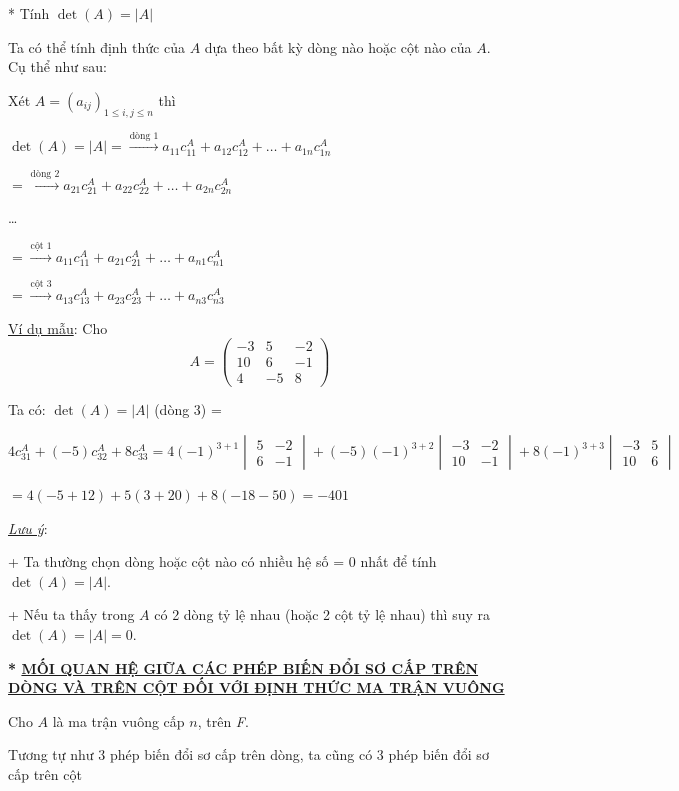 \documentclass[
]{article}
\let\ul\uline
\begin{document}
* Tính $\det(A) = |A|$

Ta có thể tính định thức của
$A$ dựa theo bất kỳ
dòng nào hoặc cột nào của
$A$. Cụ thể như
sau:

Xét $A = (a_{ij})_{1 \le i, j \le n}$ thì

$\det(A) = |A| = \xrightarrow{\text{dòng 1}} a_{11} c_{11}^A + a_{12} c_{12}^A + \dots + a_{1n} c_{1n}^A$

$= \xrightarrow{\text{dòng 2}} a_{21} c_{21}^A + a_{22} c_{22}^A + \dots + a_{2n} c_{2n}^A$

\ldots{}

$= \xrightarrow{\text{cột 1}} a_{11} c_{11}^A + a_{21} c_{21}^A + \dots + a_{n1} c_{n1}^A$

$= \xrightarrow{\text{cột 3}} a_{13} c_{13}^A + a_{23} c_{23}^A + \dots + a_{n3} c_{n3}^A$

\ul{Ví dụ mẫu}: Cho
$$A = \begin{pmatrix} -3 & 5 & -2 \\ 10 & 6 & -1 \\ 4 & -5 & 8 \end{pmatrix}$$

Ta có: $\det(A) = |A|$ (dòng 3)
=

$$4c_{31}^A + (-5)c_{32}^A + 8c_{33}^A = 4(-1)^{3+1} \begin{vmatrix} 5 & -2 \\ 6 & -1 \end{vmatrix} + (-5)(-1)^{3+2} \begin{vmatrix} -3 & -2 \\ 10 & -1 \end{vmatrix} + 8(-1)^{3+3} \begin{vmatrix} -3 & 5 \\ 10 & 6 \end{vmatrix}$$

$= 4(-5+12) + 5(3+20) + 8(-18-50) = -401$

\emph{\ul{Lưu ý}}:

+ Ta thường chọn dòng hoặc cột nào có nhiều hệ số = 0 nhất để tính
$\det(A) = |A|$.

+ Nếu ta thấy trong
$A$ có 2 dòng tỷ lệ
nhau (hoặc 2 cột tỷ lệ nhau) thì suy ra
$\det(A) = |A| = 0$.

\textbf{* \ul{MỐI QUAN HỆ GIỮA CÁC PHÉP BIẾN ĐỔI SƠ CẤP TRÊN DÒNG VÀ
TRÊN CỘT ĐỐI VỚI ĐỊNH THỨC MA TRẬN VUÔNG}}

Cho $A$ là ma trận
vuông cấp $n$, trên
\emph{F}.

Tương tự như 3 phép biến đổi sơ cấp trên dòng, ta cũng có 3 phép biến
đổi sơ cấp trên cột
\end{document}
